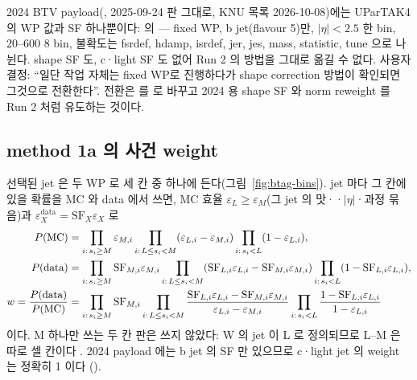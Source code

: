 2024 BTV payload(, 2025-09-24 판 그대로, KNU 목록 2026-10-08)에는 UParTAK4 의 WP 값과 SF 하나뿐이다:
 의  --- fixed WP, b jet(flavour 5)만, $|\eta|<2.5$ 한 bin, \pt{} 20–600\GeV{} 8 bin,
불확도는 fsrdef, hdamp, isrdef, jer, jes, mass, statistic, tune 으로 나뉜다. shape SF 도, c·light SF 도 없어 Run 2 의 방법을 그대로 옮길 수
없다. 사용자 결정: ``일단 작업 자체는 fixed WP로 진행하다가 shape correction 방법이 확인되면 그것으로
전환한다''\tagrunthree. 전환은  를  로 바꾸고 2024 용 shape SF 와 norm
reweight 를 Run 2 처럼 유도하는 것이다.

\subsection{method 1a 의 사건 weight}\label{sec:btag-method1a}

선택된 jet 은 두 WP 로 세 칸 중 하나에 든다(그림~\ref{fig:btag-bins}). jet 마다 그 칸에 있을 확률을 MC 와 data 에서 쓰면, MC 효율
$\varepsilon_L \geq \varepsilon_M$(그 jet 의 맛·\pt·$|\eta|$·과정 묶음)과 $\varepsilon^\text{data}_X = \mathrm{SF}_X\varepsilon_X$ 로
\begin{align}
  P(\text{MC})   &= \prod_{i:\,s_i\geq M} \varepsilon_{M,i} \prod_{i:\,L\leq s_i<M} (\varepsilon_{L,i}-\varepsilon_{M,i}) \prod_{i:\,s_i<L} (1-\varepsilon_{L,i}), \notag\\
  P(\text{data}) &= \prod_{i:\,s_i\geq M} \mathrm{SF}_{M,i}\varepsilon_{M,i} \prod_{i:\,L\leq s_i<M} (\mathrm{SF}_{L,i}\varepsilon_{L,i}-\mathrm{SF}_{M,i}\varepsilon_{M,i})
                    \prod_{i:\,s_i<L} (1-\mathrm{SF}_{L,i}\varepsilon_{L,i}), \notag\\
  w = \frac{P(\text{data})}{P(\text{MC})} &= \prod_{i:\,s_i\geq M} \mathrm{SF}_{M,i}
     \prod_{i:\,L\leq s_i<M} \frac{\mathrm{SF}_{L,i}\varepsilon_{L,i}-\mathrm{SF}_{M,i}\varepsilon_{M,i}}{\varepsilon_{L,i}-\varepsilon_{M,i}}
     \prod_{i:\,s_i<L} \frac{1-\mathrm{SF}_{L,i}\varepsilon_{L,i}}{1-\varepsilon_{L,i}}
  \label{eq:btag-method1a}
\end{align}
이다\tagimpl. M 하나만 쓰는 두 칸 판은 쓰지 않았다: W 의 jet 이 L 로 정의되므로 L–M 은 따로 셀 칸이다
\tagours. 2024 payload 에는 b jet 의 SF 만 있으므로 c·light jet 의 weight 는 정확히 1 이다
().

